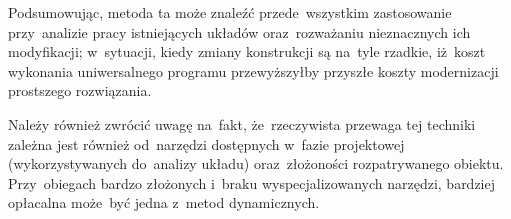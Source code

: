 Podsumowując, metoda ta może znaleźć przede~wszystkim zastosowanie
przy~analizie pracy istniejących układów oraz~rozważaniu nieznacznych
ich modyfikacji; w~sytuacji, kiedy zmiany konstrukcji są na~tyle
rzadkie, iż~koszt wykonania uniwersalnego programu przewyższyłby
przyszłe koszty modernizacji prostszego rozwiązania.

Należy również zwrócić uwagę na~fakt, że~rzeczywista przewaga tej
techniki zależna jest również od~narzędzi dostępnych w~fazie projektowej
(wykorzystywanych do~analizy układu) oraz~złożoności rozpatrywanego
obiektu. Przy~obiegach bardzo złożonych i~braku wyspecjalizowanych
narzędzi, bardziej opłacalna może~być jedna z~metod dynamicznych.
